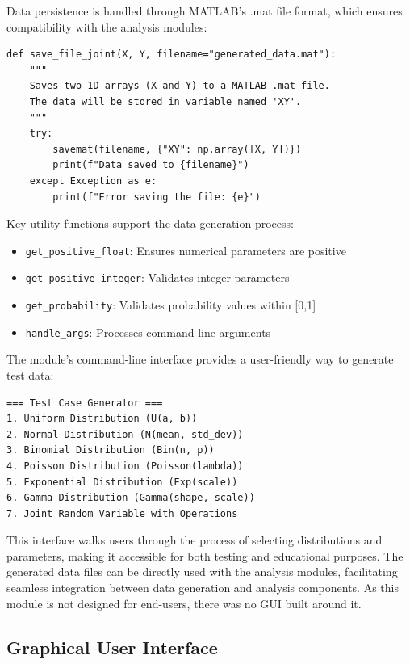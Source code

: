 \documentclass{article}
\begin{document}
Data persistence is handled through MATLAB's .mat file format, which ensures compatibility with the analysis modules:

\begin{verbatim}
def save_file_joint(X, Y, filename="generated_data.mat"):
    """
    Saves two 1D arrays (X and Y) to a MATLAB .mat file.
    The data will be stored in variable named 'XY'.
    """
    try:
        savemat(filename, {"XY": np.array([X, Y])})
        print(f"Data saved to {filename}")
    except Exception as e:
        print(f"Error saving the file: {e}")
\end{verbatim}

Key utility functions support the data generation process:

\begin{itemize}
  \item \texttt{get\_positive\_float}: Ensures numerical parameters are positive
  \item \texttt{get\_positive\_integer}: Validates integer parameters
  \item \texttt{get\_probability}: Validates probability values within [0,1]
  \item \texttt{handle\_args}: Processes command-line arguments
\end{itemize}

The module's command-line interface provides a user-friendly way to generate test data:

\begin{verbatim}
=== Test Case Generator ===
1. Uniform Distribution (U(a, b))
2. Normal Distribution (N(mean, std_dev))
3. Binomial Distribution (Bin(n, p))
4. Poisson Distribution (Poisson(lambda))
5. Exponential Distribution (Exp(scale))
6. Gamma Distribution (Gamma(shape, scale))
7. Joint Random Variable with Operations
\end{verbatim}

This interface walks users through the process of selecting distributions and parameters, making it accessible for both testing and educational purposes. The generated data files can be directly used with the analysis modules, facilitating seamless integration between data generation and analysis components. As this module is not designed for end-users, there was no GUI built around it.

\subsection{Graphical User Interface}
\end{document}

